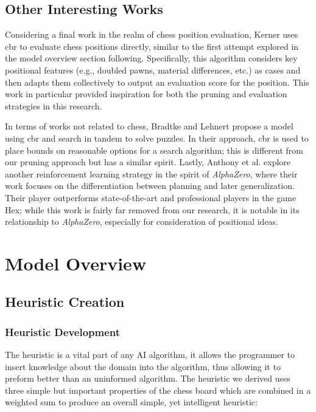 \documentclass[letterpaper]{article}
\begin{document}
\subsection{Other Interesting Works}
Considering a final work in the realm of chess position evaluation, Kerner \cite{Kerner94} uses \acrshort{cbr} to evaluate chess positions directly, similar to the first attempt explored in the model overview section following.  Specifically, this algorithm considers key positional features (e.g., doubled pawns, material differences, etc.) as cases and then adapts them collectively to output an evaluation score for the position.  This work in particular provided inspiration for both the pruning and evaluation strategies in this research.

In terms of works not related to chess, Bradtke and Lehnert \cite{bradtke-lehnert88} propose a model using \acrshort{cbr} and search in tandem to solve puzzles.  In their approach, \acrshort{cbr} is used to place bounds on reasonable options for a search algorithm; this is different from our pruning approach but has a similar spirit.  Lastly, Anthony et al. \cite{anthony-et-al2017} explore another reinforcement learning strategy in the spirit of \textit{AlphaZero}, where their work focuses on the differentiation between planning and later generalization.  Their player outperforms state-of-the-art and professional players in the game Hex; while this work is fairly far removed from our research, it is notable in its relationship to \textit{AlphaZero}, especially for consideration of positional ideas.

\section{Model Overview}
\subsection{Heuristic Creation}
\subsubsection{Heuristic Development}The heuristic is a vital part of any AI algorithm, it allows the programmer to insert knowledge about the domain into the algorithm, thus allowing it to preform better than an uninformed algorithm.
The heuristic we derived uses three simple but important properties of the chess board which are combined in a weighted sum to produce an overall simple, yet intelligent heuristic:
\end{document}
